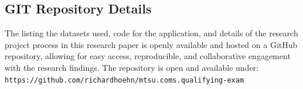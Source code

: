 \documentclass[11pt]{article}
\begin{document}
\subsection{GIT Repository Details}
The listing the datasets used, code for the application, and details of the research project process in this research paper is openly available and hosted on a GitHub repository, allowing for easy access, reproducible, and collaborative engagement with the research findings. The repository is open and available under: \texttt{https://github.com/richardhoehn/mtsu.coms.qualifying-exam}\cite{Hoehn_Improving_Emotion_Detection_2023}
\clearpage


\printbibliography
\clearpage


\listoffigures
\clearpage

\appendix
\end{document}
